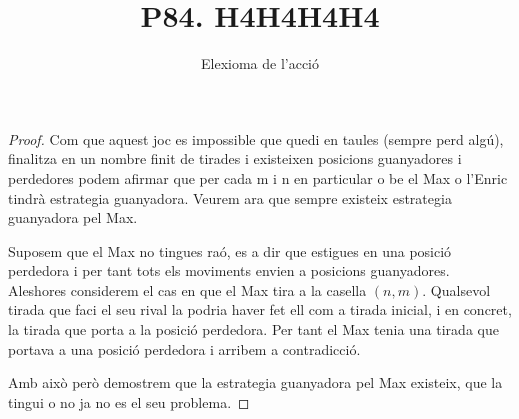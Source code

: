 \documentclass[12pt, a4papre]{article}
\author{Elexioma de l'acció}
\title{P84. H4H4H4H4}
\date{}
\begin{document}
	\maketitle
	
	\begin{proof} Com que aquest joc es impossible que quedi en taules (sempre perd algú), finalitza en un nombre finit de tirades i existeixen posicions guanyadores i perdedores podem afirmar que per cada m i n en particular o be el Max o l'Enric tindrà estrategia guanyadora. Veurem ara que sempre existeix estrategia guanyadora pel Max.
	
	Suposem que el Max no tingues raó, es a dir que estigues en una posició perdedora i per tant tots els moviments envien a posicions guanyadores. Aleshores considerem el cas en que el Max tira a la casella $(n, m)$. Qualsevol tirada que faci el seu rival la podria haver fet ell com a tirada inicial, i en concret, la tirada que porta a la posició perdedora. Per tant el Max tenia una tirada que portava a una posició perdedora i arribem a contradicció.
	
	Amb això però demostrem que la estrategia guanyadora pel Max existeix, que la tingui o no ja no es el seu problema.
	\end{proof}
	
\end{document}
